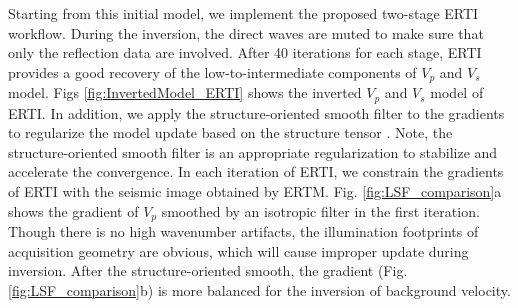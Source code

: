\documentclass[extra,mreferee]{gji}
\begin{document}
Starting from this initial model, we implement the proposed two-stage ERTI workflow.
During the inversion, the direct waves are muted to make sure that only the reflection data are involved.
After
40 iterations for each stage, ERTI provides a good recovery of the low-to-intermediate components of
$V_p$ and $V_s$ model. 
Figs \ref{fig:InvertedModel_ERTI} shows the inverted $V_p$ and $V_s$ model of ERTI.
In addition, we apply the structure-oriented smooth filter to the gradients to regularize the
model update based on the structure tensor \cite[]{Hale2009Structure,
Ma2010, Williamson2011}.
Note, the structure-oriented smooth filter is an appropriate regularization to stabilize
and accelerate the convergence. 
In each iteration of ERTI, we constrain the gradients of ERTI with the seismic image
obtained by ERTM. Fig. \ref{fig:LSF_comparison}a shows the gradient of
$V_p$ smoothed by an isotropic filter in the first iteration. Though there is no high wavenumber
artifacts, the illumination footprints of acquisition geometry are obvious, which will cause
improper update during inversion. After the structure-oriented smooth, the gradient
(Fig. \ref{fig:LSF_comparison}b) is more balanced
for the inversion of background velocity. 
\end{document}
